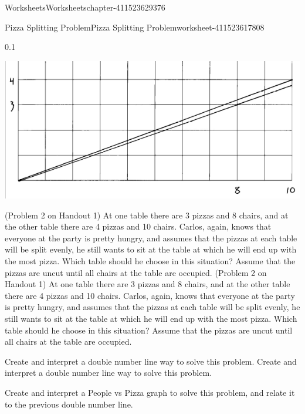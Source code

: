 \documentclass[twoside,11pt,]{book}
\begin{document}
\begin{chapterptx}{Worksheets}{}{Worksheets}{}{}{chapter-411523629376}
\begin{worksheet-section-numberless}{Pizza Splitting Problem}{}{Pizza Splitting Problem}{}{}{worksheet-411523617808}
\begin{divisionexercise}{4}{}{0.1}
\begin{sidebyside}{1}{0.05}{0.05}{0}
\begin{sbspanel}{0.9}%
\includegraphics[width=1\linewidth]{images/pizza-splitting-problem.png}
\end{sbspanel}%
\end{sidebyside}%
\end{divisionexercise}%
\begin{divisionexercise}{5}{}{}{
        (Problem 2 on Handout 1) At one table there are 3 pizzas and 8 chairs, and at the other table there are 4 pizzas and 10 chairs.  Carlos, again, knows that everyone at the party is pretty hungry, and assumes that the pizzas at each table will be split evenly, he still wants to sit at the table at which he will end up with the most pizza.  Which table should he choose in this situation? Assume that the pizzas are uncut until all chairs at the table are occupied.
      }%
\hypertarget{p-411523584816}{}%
(Problem 2 on Handout 1) At one table there are 3 pizzas and 8 chairs, and at the other table there are 4 pizzas and 10 chairs.  Carlos, again, knows that everyone at the party is pretty hungry, and assumes that the pizzas at each table will be split evenly, he still wants to sit at the table at which he will end up with the most pizza.  Which table should he choose in this situation? Assume that the pizzas are uncut until all chairs at the table are occupied.%
\end{divisionexercise}%
\begin{divisionexercise}{6}{}{}{
        Create and interpret a double number line way to solve this problem.
      }%
\hypertarget{p-411523583168}{}%
Create and interpret a double number line way to solve this problem.%
\end{divisionexercise}%
\begin{divisionexercise}{7}{}{}{
        Create and interpret a People vs Pizza graph to solve this problem, and relate it to the previous double number line.
      }%
\hypertarget{p-411523581920}{}%

\end{divisionexercise}
\end{worksheet-section-numberless}
\end{chapterptx}
\end{document}
